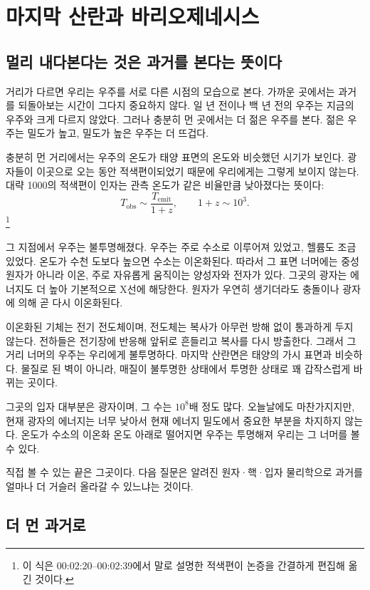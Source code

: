 \chapter{마지막 산란과 바리오제네시스}

\section{멀리 내다본다는 것은 과거를 본다는 뜻이다}

거리가 다르면 우리는 우주를 서로 다른 시점의 모습으로 본다. 가까운 곳에서는 과거를 되돌아보는 시간이 그다지 중요하지 않다. 일 년 전이나 백 년 전의 우주는 지금의 우주와 크게 다르지 않았다. 그러나 충분히 먼 곳에서는 더 젊은 우주를 본다. 젊은 우주는 밀도가 높고, 밀도가 높은 우주는 더 뜨겁다.

충분히 먼 거리에서는 우주의 온도가 태양 표면의 온도와 비슷했던 시기가 보인다. 광자들이 이곳으로 오는 동안 적색편이되었기 때문에 우리에게는 그렇게 보이지 않는다. 대략 1000의 적색편이 인자는 관측 온도가 같은 비율만큼 낮아졌다는 뜻이다:
\[
T_{\mathrm{obs}} \sim \frac{T_{\mathrm{emit}}}{1+z},
\qquad
1+z \sim 10^3.
\]\footnote{이 식은 00:02:20--00:02:39에서 말로 설명한 적색편이 논증을 간결하게 편집해 옮긴 것이다.}

그 지점에서 우주는 불투명해졌다. 우주는 주로 수소로 이루어져 있었고, 헬륨도 조금 있었다. 온도가 수천 도보다 높으면 수소는 이온화된다. 따라서 그 표면 너머에는 중성 원자가 아니라 이온, 주로 자유롭게 움직이는 양성자와 전자가 있다. 그곳의 광자는 에너지도 더 높아 기본적으로 X선에 해당한다. 원자가 우연히 생기더라도 충돌이나 광자에 의해 곧 다시 이온화된다.

이온화된 기체는 전기 전도체이며, 전도체는 복사가 아무런 방해 없이 통과하게 두지 않는다. 전하들은 전기장에 반응해 앞뒤로 흔들리고 복사를 다시 방출한다. 그래서 그 거리 너머의 우주는 우리에게 불투명하다. 마지막 산란면은 태양의 가시 표면과 비슷하다. 물질로 된 벽이 아니라, 매질이 불투명한 상태에서 투명한 상태로 꽤 갑작스럽게 바뀌는 곳이다.

그곳의 입자 대부분은 광자이며, 그 수는 \(10^8\)배 정도 많다. 오늘날에도 마찬가지지만, 현재 광자의 에너지는 너무 낮아서 현재 에너지 밀도에서 중요한 부분을 차지하지 않는다. 온도가 수소의 이온화 온도 아래로 떨어지면 우주는 투명해져 우리는 그 너머를 볼 수 있다.

직접 볼 수 있는 끝은 그곳이다. 다음 질문은 알려진 원자·핵·입자 물리학으로 과거를 얼마나 더 거슬러 올라갈 수 있느냐는 것이다.

\section{더 먼 과거로}

